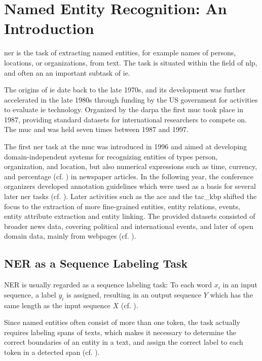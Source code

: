 \chapter{Named Entity Recognition: An Introduction}
\label{cha:ner_intro}

\gls{ner} is the task of extracting named entities, for example names of persons, locations, or organizations, from text. The task is situated within the field of \gls{nlp}, and often an an important subtask of \gls{ie}. 

The origins of \gls{ie} date back to the late 1970s, and its development was further accelerated in the late 1980s through funding by the US government for activities to evaluate \gls{ie} technology. Organized by the \gls{darpa} the first \gls{muc} took place in 1987, providing standard datasets for international researchers to compete on. The \gls{muc} and was held seven times between 1987 and 1997. 
 
The first \gls{ner} task at the \gls{muc} was introduced in 1996 and aimed at developing domain-independent systems for recognizing entities of types person, organization, and location, but also numerical expressions such as time, currency, and percentage (cf. \cite{grishman_message_1996}) in newspaper articles. In the following year, the conference organizers developed annotation guidelines which were used as a basis for several later \gls{ner} tasks (cf. \cite{muc7_ner}). 
Later activities such as the \gls{ace} and the \gls{tac_kbp} shifted the focus to the extraction of more fine-grained entities, entity relations, events, entity attribute extraction and entity linking. The provided datasets consisted of broader news data, covering political and international events, and later of open domain data, mainly from webpages (cf. \cite[229]{zong_information_2021}). 

\section{NER as a Sequence Labeling Task}
NER is usually regarded as a sequence labeling task: To each word $x_i$ in an input sequence, a label $y_i$ is assigned, resulting in an output sequence $Y$ which has the same length as the input sequence $X$ (cf. \cite[148]{jurafsky_2021}).  
 
Since named entities often consist of more than one token, the task actually requires labeling spans of texts, which makes it necessary to determine the correct boundaries of an entity in a text, and assign the correct label to each token in a detected span (cf. \cite[154-155]{jurafsky_2021}). 

